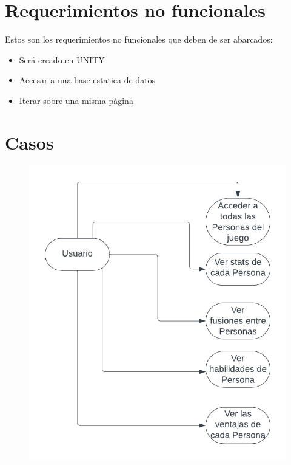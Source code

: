 \documentclass[a4paper,twoside,10pt]{report}
\begin{document}
\section{Requerimientos no funcionales}

\par Estos son los requerimientos no funcionales que deben de ser abarcados:

\begin{itemize}
	\item Será creado en UNITY
	\item Accesar a una base estatica de datos
	\item Iterar sobre una misma página
\end{itemize}

\newpage

\section{Casos}

\begin{figure}[htbp]
	\centering
		\includegraphics[width=1.00\textwidth]{Personacasos.png}
	\label{fig:Personacasos}
\end{figure}
\end{document}
